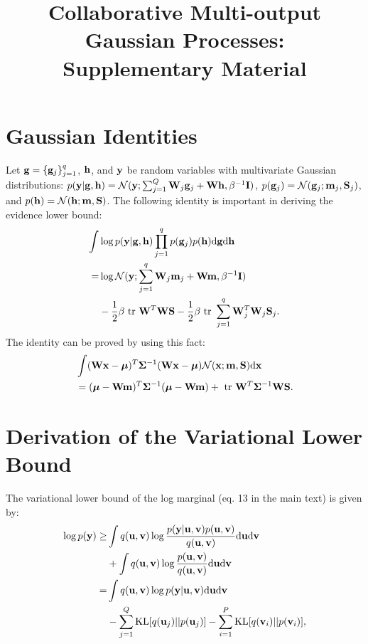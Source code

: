 \documentclass[]{article}
\title{Collaborative Multi-output Gaussian Processes: \\ Supplementary Material}
\author{} %
\begin{document}
\maketitle

\section{Gaussian Identities}
Let $\mathbf{g} = \{\mathbf{g}_j\}_{j=1}^q$, $\mathbf{h}$, and $\mathbf{y}$ be random variables with multivariate Gaussian distributions: 
$p(\mathbf{y} | \mathbf{g}, \mathbf{h}) = \mathcal{N}(\mathbf{y}; \sum_{j=1}^Q \mathbf{W}_j \mathbf{g}_j + \mathbf{W} \mathbf{h}, \beta^{-1} \mathbf{I})$, $p(\mathbf{g}_j) = \mathcal{N}(\mathbf{g}_j; \mathbf{m}_j, \mathbf{S}_j)$, and $p(\mathbf{h}) = \mathcal{N}(\mathbf{h}; \mathbf{m}, \mathbf{S})$.
The following identity is important in deriving the evidence lower bound:
\begin{align}
\nonumber
\int& \log p(\y | \g, \h) \prod_{j=1}^q p(\g_j) p(\h) \der \g \der \h \\
\nonumber
=& \log \Normal(\y; \sum_{j=1}^q \W_j \m_j + \W \m, \beta^{-1} \I) \\
& - \frac{1}{2} \beta \trace \W^T \W \S - \frac{1}{2} \beta \trace \sum_{j=1}^q \W_j^T \W_j \S_j.
 \label{eq:identity}
\end{align}
The identity can be proved by using this fact: 
\begin{align}
\nonumber
&\int (\mathbf{W}\mathbf{x} - \boldsymbol{\mu})^T \mathbf{\Sigma}^{-1} (\mathbf{W} \mathbf{x} - \boldsymbol{\mu}) \mathcal{N}(\mathbf{x}; \mathbf{m}, \mathbf{S}) \mathrm{d} \mathbf{x} \\
&= (\boldsymbol{\mu} - \mathbf{W}\mathbf{m})^T \mathbf{\Sigma}^{-1} (\boldsymbol{\mu} - \mathbf{W}\mathbf{m}) + \mbox{ \rm tr } \mathbf{W}^T \mathbf{\Sigma}^{-1} \mathbf{W} \mathbf{S}.
\end{align}


\section{Derivation of the Variational Lower Bound}
The variational lower bound of the log marginal (eq. 13 in the main text) is given by:
\begin{align}
\nonumber
\log p(\mathbf{y}) \ge& \int q(\mathbf{u}, \mathbf{v}) \log \frac{p(\mathbf{y} | \mathbf{u}, \mathbf{v}) p(\mathbf{u}, \mathbf{v})}{q(\mathbf{u}, \mathbf{v})} \mathrm{d} \mathbf{u} \mathrm{d} \mathbf{v} \\
\nonumber
&+ \int q(\mathbf{u}, \mathbf{v}) \log \frac{p(\mathbf{u}, \mathbf{v})}{q(\mathbf{u}, \mathbf{v})} \mathrm{d} \mathbf{u} \mathrm{d} \mathbf{v} \\
\nonumber
=& \int q(\mathbf{u}, \mathbf{v}) \log p(\mathbf{y} | \mathbf{u}, \mathbf{v})  \mathrm{d} \mathbf{u} \mathrm{d} \mathbf{v} \\
\nonumber
&- \sum_{j=1}^Q \text{KL}[q(\mathbf{u}_j) || p(\mathbf{u}_j)] - \sum_{i=1}^P \text{KL}[q(\mathbf{v}_i) || p(\mathbf{v}_i)],
\end{align}
\end{document}
